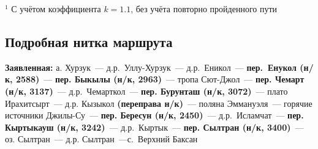 \begin{table}[h!]
\end{table}
\footnotesize{$^1$ С учётом коэффициента $k=1.1$, без учёта повторно пройденного пути}
\normalsize

\subsection{Подробная нитка маршрута}
\textbf{Заявленная:} а. Хурзук~--- д.р.~Уллу-Хурзук~--- д.р.~Еникол~--- \textbf{пер.~Енукол (н/к, 2588)}~--- \textbf{пер. Быкылы (н/к, 2963)}~--- тропа Сют-Джол~--- \textbf{пер. Чемарт (н/к, 3137)}~--- д.р.~Чемарткол~--- \textbf{пер. Бурунташ (н/к, 3072)}~--- плато Ирахитсырт~--- д.р. Кызыкол \textbf{(переправа н/к)}~--- поляна Эммануэля~--- горячие источники Джилы-Су~--- \textbf{пер. Бересун (н/к, 2450)}~--- д.р.~Исламчат~---\textbf{ пер. Кыртыкауш (н/к, 3242)}~--- д.р.~Кыртык~---\textbf{ пер. Сылтран (н/к, 3400)}~--- оз. Сылтран~--- д.р. Сылтран~---с.~Верхний Баксан


